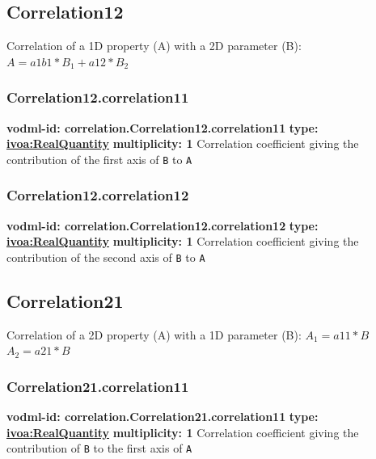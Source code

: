   \subsection{Correlation12}
  \label{sect:correlation.Correlation12}
    Correlation of a 1D property (A) with a 2D parameter (B): $A = a1b1 * B_1 + a12 * B_2$

    \subsubsection{Correlation12.correlation11}
      \textbf{vodml-id: correlation.Correlation12.correlation11} \newline
      \textbf{type: \hyperref[sect:ivoa]{ivoa:RealQuantity}} \newline
      \textbf{multiplicity: 1} \newline 
      Correlation coefficient giving the contribution of the first axis of \texttt{B} to \texttt{A}

    \subsubsection{Correlation12.correlation12}
      \textbf{vodml-id: correlation.Correlation12.correlation12} \newline
      \textbf{type: \hyperref[sect:ivoa]{ivoa:RealQuantity}} \newline
      \textbf{multiplicity: 1} \newline 
      Correlation coefficient giving the contribution of the second axis of \texttt{B} to \texttt{A}

  \subsection{Correlation21}
  \label{sect:correlation.Correlation21}
    Correlation of a 2D property (A) with a 1D parameter (B): $A_1 = a11 * B$ $A_2 = a21 * B$

    \subsubsection{Correlation21.correlation11}
      \textbf{vodml-id: correlation.Correlation21.correlation11} \newline
      \textbf{type: \hyperref[sect:ivoa]{ivoa:RealQuantity}} \newline
      \textbf{multiplicity: 1} \newline 
      Correlation coefficient giving the contribution of \texttt{B} to the first axis of \texttt{A}

